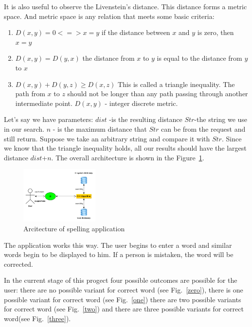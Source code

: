 \documentclass[conference]{IEEEtran}
\begin{document}
It is also useful to observe the Livenstein's distance. This distance forms a metric space. And metric space is any relation that meets some basic criteria:
\begin{enumerate}
\item $D(x, y) = 0 <=> x = y $ if the distance between $x$ and $y$ is zero, then $x=y$

\item $D(x, y) = D(y, x)$ the distance from $x$ to $y$ is equal to the distance from $y$ to $x$

\item $D(x, y) + D(y, z)\geqslant D(x, z)$ 
This is called a triangle inequality. The path from $x$ to $z$ should not be longer than any path passing through another intermediate point.
\newline $D(x, y)$ - integer discrete metric. 	
\end{enumerate}


Let's say we have parameters:
$dist$ -is the resulting distance
$Str$-the string we use in our search. 
$n$ - is the maximum distance that $Str$ can be from the request and still return.
Suppose we take an arbitrary string and compare it with $Str$. Since we know that the triangle inequality holds, all our results should have the largest distance $dist$+$n$.
The overall architecture is shown in the Figure~\ref{arh}.
\begin{figure}[!hbt]
	\centering
	\includegraphics[width=0.35\textwidth]{images/scheme}
	\caption{
		Arcitecture of spelling application}
	\label{arh}
\end{figure}


The application works this way. The user begins to enter a word and similar words begin to be displayed to him. If a person is mistaken, the word will be corrected.


In the current stage of this progect four possible outcomes are possible for the user: there are no possible variant for correct word (see Fig.~\ref{zero}), there is one possible variant for correct word (see Fig.~\ref{one}) there are two possible variants for correct word (see Fig.~\ref{two}) and there are three possible variants for correct word(see Fig.~\ref{three}). 
\end{document}
